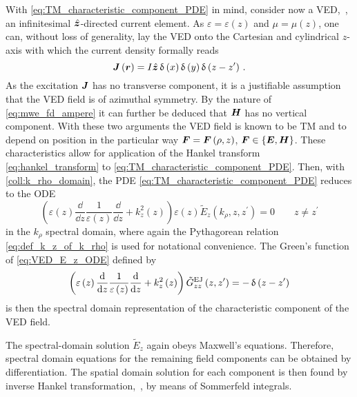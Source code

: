 With \eqref{eq:TM_characteristic_component_PDE} in mind, consider now 
a \ac{VED},~\ie, an infinitesimal $\uv{z}$-directed current element.
As $\varepsilon = \varepsilon\left(z\right)$ and $\mu = \mu\left(z\right)$,
one can, without loss of generality, lay the \ac{VED} onto the Cartesian
and cylindrical $z$-axis with which the current density formally reads
\begin{equation}\label{eq:VED_current_density}
	\pvec{J} \left(\pvec{r}\right) =
	I \uv{z}
	\diracDelta\left(x\right)
	\diracDelta\left(y\right)
	\diracDelta\left(z - z^\prime\right)
	\, .
\end{equation}
As the excitation $\pvec{J}$ has no transverse component, it is a justifiable
assumption that the \ac{VED} field is of azimuthal symmetry.
By the nature of \eqref{eq:mwe_fd_ampere} it can further be deduced that
$\pvec{H}$ has no vertical component.
With these two arguments the \ac{VED} field is known to be \ac{TM} and to depend
on position in the particular way
$\pvec{F} = \pvec{F} \left(\rho, z\right)$,
$\pvec{F} \in \left\{\pvec{E}, \pvec{H}\right\}$.
These characteristics allow for application of the Hankel transform
\eqref{eq:hankel_transform} to \eqref{eq:TM_characteristic_component_PDE}.
Then, with \cref{coll:k_rho_domain}, the \ac{PDE}
\eqref{eq:TM_characteristic_component_PDE} reduces to the \ac{ODE}
\begin{equation}\label{eq:VED_E_z_ODE}
	\left(
		\varepsilon \left(z\right)
		\frac{\dd}{\dd z}
		\frac{1}{\varepsilon \left(z\right)}
		\frac{\dd}{\dd z}
		+
		k_z^2 \left(z\right)
	\right)
	\varepsilon \left(z\right)
	\tilde{E}_z \left(k_\rho, z, z^\prime\right) = 0
	\qquad
	z \neq z^\prime
\end{equation}
in the $k_\rho$ spectral domain, where again the Pythagorean relation
\eqref{eq:def_k_z_of_k_rho} is used for notational convenience.
The Green's function of \eqref{eq:VED_E_z_ODE} defined by
\begin{equation}\label{eq:VED_E_z_ODE_greens_function_def}
	\left(
		\varepsilon \left(z\right)
		\frac{\mathrm{d}}{\mathrm{d} z}
		\frac{1}{\varepsilon \left(z\right)}
		\frac{\mathrm{d}}{\mathrm{d} z}
		+
		k_z^2 \left(z\right)
	\right)
	\tilde{G}^\mathrm{EJ}_{zz} \left(z, z^\prime\right)
	=
	-\operatorname{\updelta} \left( z - z^\prime \right)
\end{equation}
is then the spectral domain representation of the characteristic component of
the \ac{VED} field.

The spectral-domain solution $\tilde{E}_z$ again obeys Maxwell's equations.
Therefore, spectral domain equations for the remaining field components can be
obtained by differentiation.
The spatial domain solution for each component is then found by inverse Hankel
transformation,~\ie, by means of Sommerfeld integrals.






